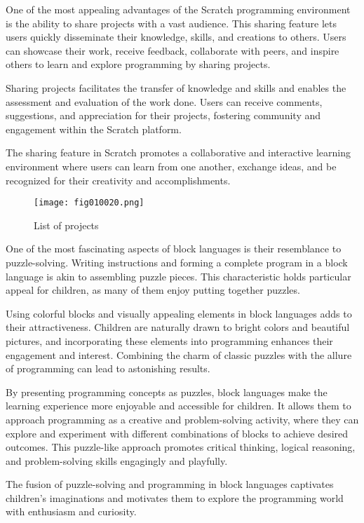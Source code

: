 One of the most appealing advantages of the Scratch programming environment is the ability to share projects with a vast audience. This sharing feature lets users quickly disseminate their knowledge, skills, and creations to others. Users can showcase their work, receive feedback, collaborate with peers, and inspire others to learn and explore programming by sharing projects.

Sharing projects facilitates the transfer of knowledge and skills and enables the assessment and evaluation of the work done. Users can receive comments, suggestions, and appreciation for their projects, fostering community and engagement within the Scratch platform.

The sharing feature in Scratch promotes a collaborative and interactive learning environment where users can learn from one another, exchange ideas, and be recognized for their creativity and accomplishments.

\begin{figure}[H]
   \centering
   \texttt{[image: fig010020.png]}
   \caption{List of projects}
\label{fig010020}
\end{figure}

One of the most fascinating aspects of block languages is their resemblance to puzzle-solving. Writing instructions and forming a complete program in a block language is akin to assembling puzzle pieces. This characteristic holds particular appeal for children, as many of them enjoy putting together puzzles.

Using colorful blocks and visually appealing elements in block languages adds to their attractiveness. Children are naturally drawn to bright colors and beautiful pictures, and incorporating these elements into programming enhances their engagement and interest. Combining the charm of classic puzzles with the allure of programming can lead to astonishing results.

By presenting programming concepts as puzzles, block languages make the learning experience more enjoyable and accessible for children. It allows them to approach programming as a creative and problem-solving activity, where they can explore and experiment with different combinations of blocks to achieve desired outcomes. This puzzle-like approach promotes critical thinking, logical reasoning, and problem-solving skills engagingly and playfully.

The fusion of puzzle-solving and programming in block languages captivates children's imaginations and motivates them to explore the programming world with enthusiasm and curiosity.

